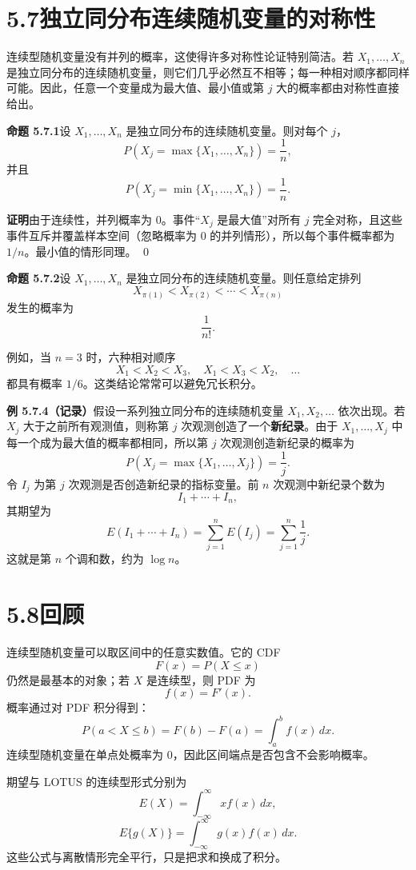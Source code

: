 \documentclass[UTF8,12pt,a4paper,fontset=fandol]{ctexart}
\begin{document}
\section*{5.7\quad 独立同分布连续随机变量的对称性}

连续型随机变量没有并列的概率，这使得许多对称性论证特别简洁。若 $X_1,\ldots,X_n$ 是独立同分布的连续随机变量，则它们几乎必然互不相等；每一种相对顺序都同样可能。因此，任意一个变量成为最大值、最小值或第 $j$ 大的概率都由对称性直接给出。

\noindent\textbf{命题 5.7.1}\quad 设 $X_1,\ldots,X_n$ 是独立同分布的连续随机变量。则对每个 $j$，
\[
  P(X_j=\max\{X_1,\ldots,X_n\})=\frac1n,
\]
并且
\[
  P(X_j=\min\{X_1,\ldots,X_n\})=\frac1n.
\]

\noindent\textbf{证明}\quad 由于连续性，并列概率为 $0$。事件“$X_j$ 是最大值”对所有 $j$ 完全对称，且这些事件互斥并覆盖样本空间（忽略概率为 $0$ 的并列情形），所以每个事件概率都为 $1/n$。最小值的情形同理。
\qed

\noindent\textbf{命题 5.7.2}\quad 设 $X_1,\ldots,X_n$ 是独立同分布的连续随机变量。则任意给定排列
\[
  X_{\pi(1)}<X_{\pi(2)}<\cdots<X_{\pi(n)}
\]
发生的概率为
\[
  \frac1{n!}.
\]

例如，当 $n=3$ 时，六种相对顺序
\[
  X_1<X_2<X_3,\quad X_1<X_3<X_2,\quad \ldots
\]
都具有概率 $1/6$。这类结论常常可以避免冗长积分。

\noindent\textbf{例 5.7.4（记录）}\quad 假设一系列独立同分布的连续随机变量 $X_1,X_2,\ldots$ 依次出现。若 $X_j$ 大于之前所有观测值，则称第 $j$ 次观测创造了一个\textbf{新纪录}。由于 $X_1,\ldots,X_j$ 中每一个成为最大值的概率都相同，所以第 $j$ 次观测创造新纪录的概率为
\[
  P(X_j=\max\{X_1,\ldots,X_j\})=\frac1j.
\]
令 $I_j$ 为第 $j$ 次观测是否创造新纪录的指标变量。前 $n$ 次观测中新纪录个数为
\[
  I_1+\cdots+I_n,
\]
其期望为
\[
  E(I_1+\cdots+I_n)=\sum_{j=1}^nE(I_j)=\sum_{j=1}^n\frac1j.
\]
这就是第 $n$ 个调和数，约为 $\log n$。

\section*{5.8\quad 回顾}

连续型随机变量可以取区间中的任意实数值。它的 CDF
\[
  F(x)=P(X\le x)
\]
仍然是最基本的对象；若 $X$ 是连续型，则 PDF 为
\[
  f(x)=F'(x).
\]
概率通过对 PDF 积分得到：
\[
  P(a<X\le b)=F(b)-F(a)=\int_a^b f(x)\,dx.
\]
连续型随机变量在单点处概率为 $0$，因此区间端点是否包含不会影响概率。

期望与 LOTUS 的连续型形式分别为
\[
  E(X)=\int_{-\infty}^{\infty}x f(x)\,dx,
\]
\[
  E\{g(X)\}=\int_{-\infty}^{\infty}g(x)f(x)\,dx.
\]
这些公式与离散情形完全平行，只是把求和换成了积分。
\end{document}
